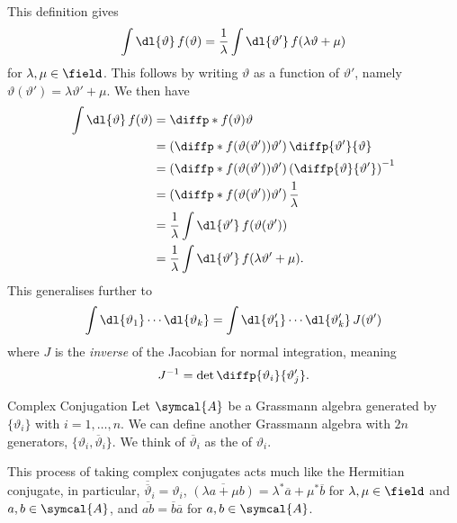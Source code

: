 This definition gives
\begin{equation}
    \int \dl{\vartheta} \, f(\vartheta) = \frac{1}{\lambda} \int \dl{\vartheta'} \, f(\lambda \vartheta + \mu)
\end{equation}
for \(\lambda, \mu \in \field\).
This follows by writing \(\vartheta\) as a function of \(\vartheta'\), namely \(\vartheta(\vartheta') = \lambda \vartheta' + \mu\).
We then have
\begin{align}
    \int \dl{\vartheta} \, f(\vartheta) &= \diffp*{f(\vartheta)}{\vartheta}\\
    &= \left( \diffp*{f(\vartheta(\vartheta'))}{\vartheta'} \right) \diffp{\vartheta'}{\vartheta} \\
    &= \left( \diffp*{f(\vartheta(\vartheta'))}{\vartheta'} \right) \left( \diffp{\vartheta}{\vartheta'} \right)^{-1} \\
    &= \left( \diffp*{f(\vartheta(\vartheta'))}{\vartheta'} \right) \frac{1}{\lambda}\\
    &= \frac{1}{\lambda} \int \dl{\vartheta'} \, f(\vartheta(\vartheta'))\\
    &= \frac{1}{\lambda} \int \dl{\vartheta'} \, f(\lambda\vartheta' + \mu).
\end{align}
This generalises further to
\begin{equation}
    \int \dl{\vartheta_1} \dotsm \dl{\vartheta_k} = \int \dl{\vartheta'_1} \dotsm \dl{\vartheta'_k} \, J(\vartheta')
\end{equation}
where \(J\) is the \emph{inverse} of the Jacobian for normal integration, meaning
\begin{equation}
    J^{-1} = \det \diffp{\vartheta_i}{\vartheta_j'}.
\end{equation}

\begin{dfn}{Complex Conjugation}{}
    Let \(\symcal{A}\) be a Grassmann algebra generated by \(\{\vartheta_i\}\) with \(i = 1, \dotsc, n\).
    We can define another Grassmann algebra with \(2n\) generators, \(\{\vartheta_i, \overbar{\vartheta}_i\}\).
    We think of \(\overbar{\vartheta}_i\) as the  of \(\vartheta_i\).
\end{dfn}
This process of taking complex conjugates acts much like the Hermitian conjugate, in particular, \(\overbar{\overbar{\vartheta}}_i = \vartheta_i\), \(\overline{(\lambda a + \mu b)} = \lambda^* \overbar{a} + \mu^* \overbar{b}\) for \(\lambda, \mu \in \field\) and \(a, b \in \symcal{A}\), and \(\overline{ab} = \overbar{b}\overbar{a}\) for \(a, b \in \symcal{A}\).

